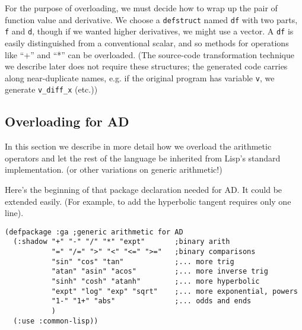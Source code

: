 \documentclass{article}
\begin{document}
For the purpose of overloading, we must decide how to wrap up the pair
of function value and derivative.  We choose a {\tt defstruct} named
{\tt df} with two parts, {\tt f} and {\tt d}, though if we wanted
higher derivatives, we might use a vector.  A {\tt df} is easily
distinguished from a conventional scalar, and so methods for
operations like ``+'' and ``*'' can be
overloaded.  (The source-code transformation technique we describe
later does not require these structures; the generated code carries
along near-duplicate names, e.g. if the original program has variable
{\tt v}, we generate {\tt v\_diff\_x} (etc.))

\subsection{Overloading for AD}
In this section we describe in more detail how we overload the
arithmetic operators and let the rest of the language be inherited
from Lisp's standard implementation. (or other variations on generic
arithmetic!)

Here's the beginning
of that package declaration needed for AD. It could be extended easily. (For
example, to add the hyperbolic tangent requires only one line).

\begin{verbatim}
(defpackage :ga ;generic arithmetic for AD
  (:shadow "+" "-" "/" "*" "expt"       ;binary arith
           "=" "/=" ">" "<" "<=" ">="   ;binary comparisons
           "sin" "cos" "tan"            ;... more trig
           "atan" "asin" "acos"         ;... more inverse trig
           "sinh" "cosh" "atanh"        ;... more hyperbolic
           "expt" "log" "exp" "sqrt"    ;... more exponential, powers
           "1-" "1+" "abs"              ;... odds and ends
           )
  (:use :common-lisp))
\end{verbatim}
\end{document}
